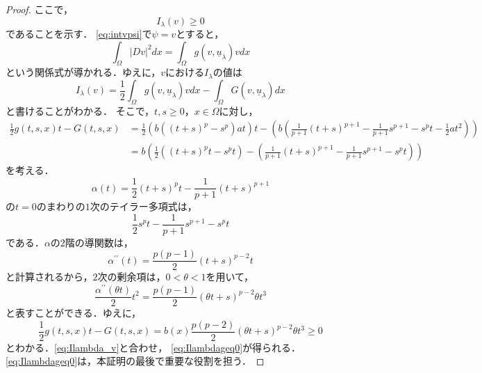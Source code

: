 \begin{proof}
 ここで，
 \begin{equation}
  I_\lambda(v) \geq 0 \label{eq:Ilambdageq0}
 \end{equation}
 であることを示す．
 \eqref{eq:intvpsi}で$\psi = v$とすると，
 \begin{equation}
  \int_\Omega \lvert Dv \rvert^2 dx = \int_\Omega g(v,
   \underline{u}_\lambda)v dx \label{eq:v_kankei}
 \end{equation}
 という関係式が導かれる．ゆえに，$v$における$I_\lambda$の値は
 \begin{equation}
  I_\lambda (v) = \frac{1}{2} \int_\Omega g(v, \underline{u}_\lambda)
   v dx - \int_\Omega G(v, \underline{u}_\lambda) dx \label{eq:Ilambda_v}
 \end{equation}
 と書けることがわかる．
 そこで，$t, s \geq 0$，$x \in \Omega$に対し，
 \begin{align*}
  \frac{1}{2} g(t, s, x) t - G(t, s, x) &= \frac{1}{2} \left(b \left(
  (t+s)^p - s^p \right) at \right)t - \left( b \left(
  \frac{1}{p+1}(t+s)^{p+1} - \frac{1}{p+1}s^{p+1} - s^p t -
  \frac{1}{2}at^2  \right) \right) \\
  &= b \left( \frac{1}{2} \left( (t+s)^pt - s^pt \right) -\left(
  \frac{1}{p+1} (t+s)^{p+1} - \frac{1}{p+1} s^{p+1} - s^p t \right) \right)
 \end{align*}
 を考える．
 \[
  \alpha(t) = \frac{1}{2} (t+s)^p t - \frac{1}{p+1}(t+s)^{p+1}
 \]
 の$t = 0$のまわりの$1$次のテイラー多項式は，
 \[
  \frac{1}{2} s^p t - \frac{1}{p+1}s^{p+1} - s^p t
 \]
 である．$\alpha$の$2$階の導関数は，
 \[
  \alpha^{\prime\prime}(t) = \frac{p(p-1)}{2}(t+s)^{p-2}t
 \]
 と計算されるから，$2$次の剰余項は，$0 < \theta < 1$を用いて，
 \[
  \frac{\alpha^{\prime\prime}(\theta t)}{2} t^2 =
 \frac{p(p-1)}{2}(\theta t + s)^{p-2} \theta t^3
 \]
 と表すことができる．ゆえに，
 \[
  \frac{1}{2} g(t, s, x)t - G(t, s, x) = b(x) \frac{p(p-2)}{2} (\theta
 t + s)^{p-2} \theta t^3 \geq 0
 \]
 とわかる．\eqref{eq:Ilambda_v}と合わせ，
 \eqref{eq:Ilambdageq0}が得られる．
 \eqref{eq:Ilambdageq0}は，本証明の最後で重要な役割を担う．


\end{proof}
